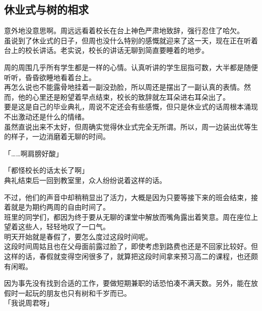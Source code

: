 \subsection{休业式与树的相求}

意外地没意思啊。周远远看着校长在台上神色严肃地致辞，强行忍住了哈欠。\\

虽说到了休业式的日子，但周也没什么特别的感慨就迎来了这一天，现在正在听着台上的校长讲话。老实说，校长的讲话无聊到简直要睡着的地步。

周的周围几乎所有学生都是一样的心情。认真听讲的学生屈指可数，大半都是随便听听，昏昏欲睡地看着台上。\\

再怎么说也不能露骨地挂着一副没劲脸，所以周还是摆出了一副认真的表情。然而，他的心里还是盼望着早点结束，校长的致辞就左耳朵进右耳朵出了。\\

要是这是自己的毕业典礼，周说不定还会有些感慨，但只是休业式的话周根本涌现不出激动还是什么的情绪。\\

虽然直说出来不太好，但周确实觉得休业式完全无所谓。所以，周一边装出优等生的样子，一边消磨着无聊的时间。\\

\vspace{2\baselineskip}

「……啊肩膀好酸」

「都怪校长的话太长了啊」\\

典礼结束后一回到教室里，众人纷纷说着这样的话。

不过，他们的声音中却稍稍显出了活力，大概是因为只要等接下来的班会结束，接着就是为期约两周的自由时间了。\\

班里的同学们，都因为终于要从无聊的课堂中解放而嘴角露出着笑意。周在座位上望着这些人，轻轻地叹了一口气。\\

明天开始就是春假了，要怎么度过这段时间呢。\\

这段时间周姑且也在父母面前露过脸了，即使考虑到路费也还是不回家比较好。但这样的话，春假就变得空闲很多了，就算把这段时间拿来预习高二的课程，也还颇有闲暇。

因为事先没有找到合适的工作，要做短期兼职的话恐怕凑不满天数。另外，能在放假时一起玩的朋友也只有树和千岁而已。\\

「我说周君呀」\\


